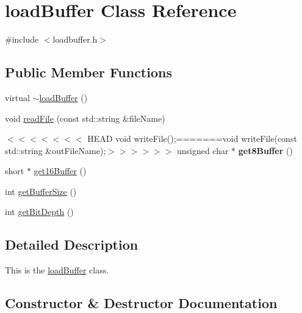 \hypertarget{classloadBuffer}{}\section{load\+Buffer Class Reference}
\label{classloadBuffer}


{\ttfamily \#include $<$loadbuffer.\+h$>$}

\subsection*{Public Member Functions}
\begin{DoxyCompactItemize}
\item 
virtual \hyperlink{classloadBuffer_a569f285c4f37d2880c1619842d54917a}{$\sim$load\+Buffer} ()
\item 
void \hyperlink{classloadBuffer_adfdc981dd37280f382467ecd6fb087c6}{read\+File} (const std\+::string \&file\+Name)
\item 
\mbox{\label{classloadBuffer_ace04b355c2b23c72abd1d322dcb960ee}} 
$<$$<$$<$$<$$<$$<$$<$ H\+E\+AD void write\+File();=======void write\+File(const std\+::string \&out\+File\+Name);$>$$>$$>$$>$$>$$>$ unsigned char $\ast$ {\bfseries get8\+Buffer} ()
\item 
short $\ast$ \hyperlink{classloadBuffer_aa6b14cb999de76cfce307f7036310859}{get16\+Buffer} ()
\item 
int \hyperlink{classloadBuffer_afdb86606188438cef499304c2a0af433}{get\+Buffer\+Size} ()
\item 
int \hyperlink{classloadBuffer_aa4d8b0a75f4459dc0f255f62d822e14b}{get\+Bit\+Depth} ()
\end{DoxyCompactItemize}


\subsection{Detailed Description}
This is the \hyperlink{classloadBuffer}{load\+Buffer} class. 

\subsection{Constructor \& Destructor Documentation}
\mbox{\label{classloadBuffer_a569f285c4f37d2880c1619842d54917a}} 
